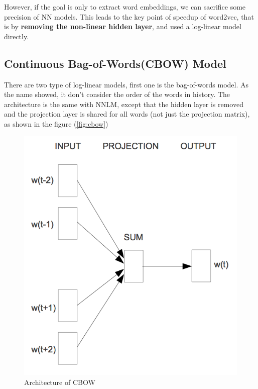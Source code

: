 \documentclass[]{article}
\begin{document}
However, if the goal is only to extract word embeddings, we can
sacrifice some precision of NN models. This leads to the key point of
speedup of word2vec, that is by \textbf{removing the non-linear hidden
layer}, and used a log-linear model directly.

\subsection{Continuous Bag-of-Words(CBOW)
Model}\label{continuous-bag-of-wordscbow-model}

There are two type of log-linear models, first one is the bag-of-words
model. As the name showed, it don't consider the order of the words in
history. The architecture is the same with NNLM, except that the hidden
layer is removed and the projection layer is shared for all words (not
just the projection matrix), as shown in the figure (\autoref{fig:cbow})

\begin{figure}[h]\centering\includegraphics[width=\textwidth]{source//images/posts/cbow.png}\caption{Architecture of CBOW}\label{fig:cbow}\end{figure}
\end{document}
